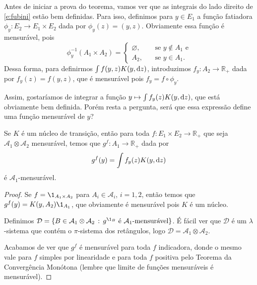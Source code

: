 Antes de iniciar a prova do teorema, vamos ver que as integrais do lado direito de \eqref{e:fubini} estão bem definidas.
Para isso, definimos para $y \in E_1$ a função fatiadora $\phi_y: E_2 \to E_1 \times E_2$ dada por $\phi_y(z) = (y, z)$.
Obviamente essa função é mensurável, pois
\begin{equation}
  \phi_y^{-1}(A_1 \times A_2) =
  \begin{cases}
    \varnothing, \quad & \text{ se $y \not \in A_1$ e}\\
    A_2, & \text{ se $y \in A_1$}.
  \end{cases}
\end{equation}
Dessa forma, para definirmos $\int f(y,z) K(y, \mathop{}\!\mathrm{d} z)$, introduzimos $f_y: A_2 \to \mathbb{R}_+$ dada por $f_y(z) = f(y,z)$, que é mensurável pois $f_y = f \circ \phi_y$.

Assim, gostaríamos de integrar a função $y \mapsto \int f_y(z) K(y, \mathop{}\!\mathrm{d} z)$, que está obviamente bem definida.
Porém resta a pergunta, será que essa expressão define uma função mensurável de $y$?

\begin{lemma}
  Se $K$ é um núcleo de transição, então para toda $f: E_1 \times E_2 \to \mathbb{R}_+$ que seja $\mathcal{A}_1 \otimes \mathcal{A}_2$ mensurável, temos que $g^f:A_1 \to \mathbb{R}_+$ dada por
  \begin{equation}
    g^f(y) = \int f_y(z) K(y, \mathop{}\!\mathrm{d} z)
  \end{equation}
  é $\mathcal{A}_1$-mensurável.
\end{lemma}

\begin{proof}
  Se $f = \1_{A_1 \times A_2}$ para $A_i \in \mathcal{A}_i$, $i = 1,2$, então temos que $g^f(y) = K(y, A_2) \1_{A_1}$, que obviamente é mensurável pois $K$ é um núcleo.

  Definimos $\mathcal{D} = \{B \in \mathcal{A}_1 \otimes \mathcal{A}_2\, : \, g^{\1_B} \text{ é $\mathcal{A}_1$-mensurável}\}$.
  É fácil ver que $\mathcal{D}$ é um $\lambda$-sistema que contém o $\pi$-sistema dos retângulos, logo $\mathcal{D} = \mathcal{A}_1 \otimes \mathcal{A}_2$.

  Acabamos de ver que $g^f$ é mensurável para toda $f$ indicadora, donde o mesmo vale para $f$ simples por linearidade e para toda $f$ positiva pelo Teorema da Convergência Monótona (lembre que limite de funções mensuráveis é mensurável).
\end{proof}

